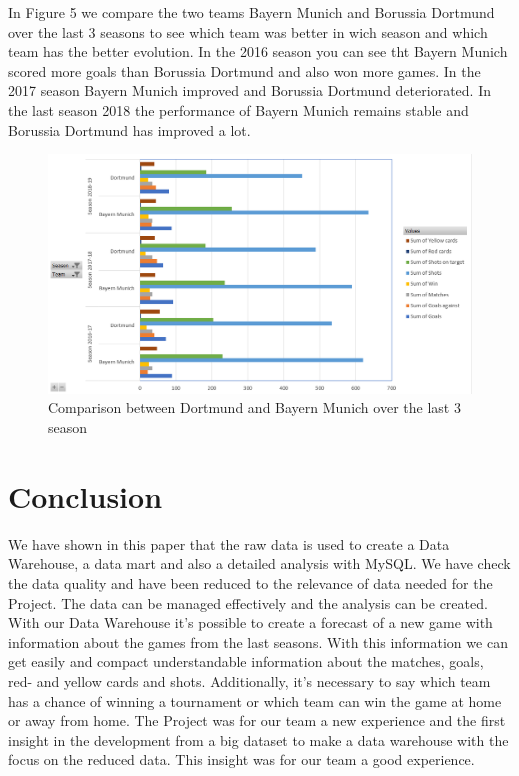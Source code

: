 \documentclass[11pt, journal]{IEEEtran}
\begin{document}
In Figure 5 we compare the two teams Bayern Munich and Borussia Dortmund over the last 3 seasons to see which team was better in wich season and which team has the better evolution. In the 2016 season you can see tht Bayern Munich scored more goals than Borussia Dortmund and also won more games. In the 2017 season Bayern Munich improved and Borussia Dortmund deteriorated. In the last season 2018 the performance of Bayern Munich remains stable and Borussia Dortmund has improved a lot.
\begin{figure}[htb]
	\centering
		\includegraphics[width=1.0\columnwidth]{images/BarGraph_Comparison_BayernMunich-Dortmund_LastThreeSeasons}
	\caption{Comparison between Dortmund and Bayern Munich over the last 3 season}
	\label{fig:probov}
\end{figure}

\section{Conclusion} \label{sec:concl}
We have shown in this paper that the raw data is used to create a Data Warehouse, a data mart and also a detailed analysis with MySQL. We have check the data quality and have been reduced to the relevance of data needed for the Project. The data can be managed effectively and the analysis can be created. With our Data Warehouse it’s possible to create a forecast of a new game with information about the games from the last seasons. With this information we can get easily and compact understandable information about the matches, goals, red- and yellow cards and shots. Additionally, it’s necessary to say which team has a chance of winning a tournament or which team can win the game at home or away from home. The Project was for our team a new experience and the first insight in the development from a big dataset to make a data warehouse with the focus on the reduced data. This insight was for our team a good experience. 



\end{document}
